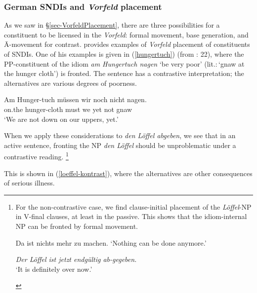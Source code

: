\documentclass[output=paper]{langsci/langscibook}
\begin{document}

\subsubsection{German SNDIs and \textit{Vorfeld} placement}


As we saw in §\ref{sec-VorfeldPlacement}, there are three possibilities for a constituent to be licensed in the \textit{Vorfeld}: formal movement, base generation, and Ā-movement for contrast. \cite{Fanselow:04} provides examples of \emph{Vorfeld} placement of constituents of SNDIs. One of his examples is given in (\ref{hungertuch}) (from \citeauthor{Fanselow:04} \citeyear{Fanselow:04}: 22), where the PP-constituent of the idiom \textit{am Hungertuch nagen} `be very poor' (lit.:\,`gnaw at the hunger cloth') is fronted. The sentence has a contrastive interpretation; the alternatives are various degrees of poorness.

\ea
\gll Am Hunger-tuch m\"ussen wir noch nicht nagen.\\
on.the hunger-cloth must we yet not gnaw\\
\glt `We are not down on our uppers, yet.'\label{hungertuch}
\z

\newpage 
When we apply these considerations to \textit{den L\"offel abgeben}, we see that in an active sentence, fronting the NP \textit{den L\"offel} should be unproblematic under a contrastive reading.%
\footnote{For the non-contrastive case, we find clause-initial placement of the \textit{L\"offel}-NP in V-final clauses, at least in the  passive. This shows that the idiom-internal NP can be fronted by formal movement.

\begin{exe}
\ex \label{zu machen}
Da ist nichts mehr zu machen. \textnormal{`Nothing can be done anymore.'}
\begin{xlist}
\ex
 \textit{Der L\"offel ist jetzt endg\"ultig ab-gegeben.}\\
\textnormal{`It is definitely over now.'}
\end{xlist}
\end{exe}
}


This is shown in (\ref{loeffel-kontrast}), where the alternatives are other consequences of serious illness.
\end{document}
